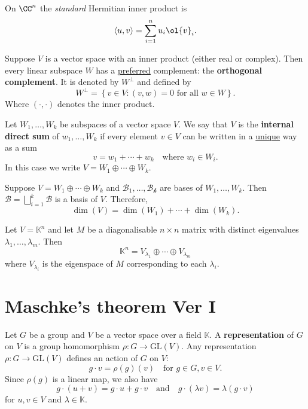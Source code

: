 \documentclass[12pt, a4paper]{article}
\newcommand{\gl}{\text{GL}}
\newcommand{\KK}{\mathbb{K}}
\begin{document}
\begin{definition}
    On \(\CC^n\) the \textit{standard} Hermitian inner product is 
    \[\langle u,v \rangle = \sum_{i=1}^{n} u_i \ol{v}_i.\]
\end{definition}

\begin{mdexample}
    Suppose \(V\) is a vector space with an inner product (either real or complex). Then every linear subspace \(W\) has a \ul{preferred} complement: the \textbf{orthogonal complement}. It is denoted by \(W^{\perp}\) and defined by 
    \[W^{\perp}=\left\{ v \in V :(v,w)=0 \text{ for all } w\in W\right\}.\]
    Where \((\cdot,\cdot)\) denotes the inner product.
\end{mdexample}

\begin{definition}
    Let \(W_1,\ldots,W_k\) be subspaces of a vector space \(V\). We say that \(V\) is the \textbf{internal direct sum} of \(w_1,\ldots,W_k\) if every element \(v \in V\) can be written in a \ul{unique} way as a sum 
    \[v = w_1+\cdots+w_k \quad \text{where } w_i \in W_i.\]
    In this case we write \(V=W_1 \oplus \cdots \oplus W_k\).
\end{definition}

\begin{mdremark}
    Suppose \(V = W_1 \oplus \cdots \oplus W_k\) and \(\mathcal{B}_1,\ldots,\mathcal{B_k}\) are bases of \(W_1,\ldots,W_k\). Then \(\mathcal{B} = \bigsqcup_{i=1}^k \mathcal{B}\) is a basis of \(V\). Therefore,
    \[\dim(V)=\dim(W_1)+\cdots+\dim(W_k).\]
\end{mdremark}

\begin{mdexample}
    Let \(V=\KK^n\) and let \(M\) be a diagonalisable \(n\times n\) matrix with distinct eigenvalues \(\lambda_1,\ldots,\lambda_m\). Then 
    \[\KK^n = V_{\lambda_1} \oplus \cdots \oplus V_{\lambda_m}\]
    where \(V_{\lambda_i}\) is the eigenspace of \(M\) corresponding to each \(\lambda_i\).
\end{mdexample}

\section{Maschke's theorem Ver I}

\begin{definition}
    Let \(G\) be a group and \(V\) be a vector space over a field \(\KK\). A \textbf{representation} of \(G\) on \(V\) is a group homomorphism \(\rho:G \to \gl(V)\). Any representation \(\rho:G \to \gl(V)\) defines an action of \(G\) on \(V\): 
    \[g\cdot v = \rho(g)(v) \quad \text{for } g\in G, v\in V.\]
    Since \(\rho(g)\) is a linear map, we also have 
    \[g\cdot (u+v)=g\cdot u +g\cdot v \quad \text{and} \quad g\cdot (\lambda v)=\lambda(g\cdot v)\]
    for \(u,v \in V\) and \(\lambda\in \KK\).
\end{definition}
\end{document}

